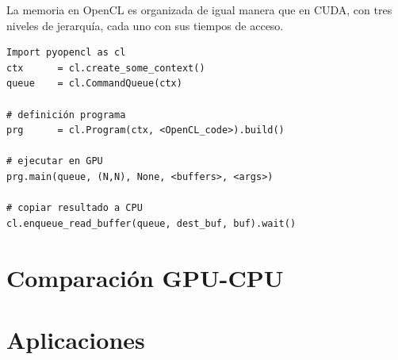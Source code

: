 La memoria en OpenCL es organizada de igual manera que en CUDA, con tres niveles de jerarquía, cada uno con sus tiempos de acceso.



\begin{verbatim}
Import pyopencl as cl
ctx      = cl.create_some_context()
queue    = cl.CommandQueue(ctx)

# definición programa
prg      = cl.Program(ctx, <OpenCL_code>).build()

# ejecutar en GPU
prg.main(queue, (N,N), None, <buffers>, <args>) 

# copiar resultado a CPU
cl.enqueue_read_buffer(queue, dest_buf, buf).wait()
\end{verbatim}

\section{Comparación GPU-CPU}

\section{Aplicaciones}
